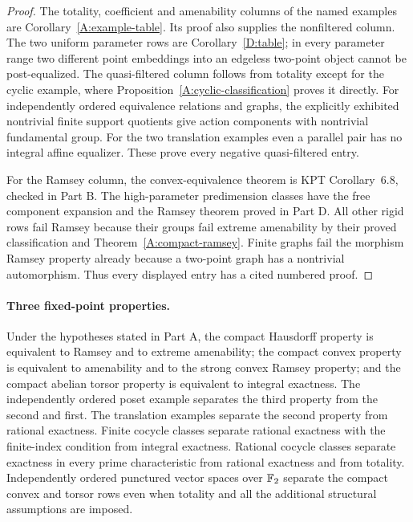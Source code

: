 \begin{proof}
The totality, coefficient and amenability columns of the named
examples are Corollary~\ref{A:example-table}. Its proof also supplies
the nonfiltered column. The two uniform parameter rows are
Corollary~\ref{D:table}; in every parameter range two different point
embeddings into an edgeless two-point object cannot be post-equalized.
The quasi-filtered column follows from totality except for the cyclic
example, where Proposition~\ref{A:cyclic-classification} proves it
directly. For independently ordered equivalence relations and graphs,
the explicitly exhibited nontrivial finite support quotients give
action components with nontrivial fundamental group. For the two
translation examples even a parallel pair has no integral affine
equalizer. These prove every negative quasi-filtered entry.

For the Ramsey column, the convex-equivalence theorem is KPT
Corollary~6.8, checked in Part B. The high-parameter predimension
classes have the free component expansion and the Ramsey theorem
proved in Part D. All other rigid rows fail Ramsey because their
groups fail extreme amenability by their proved classification and
Theorem~\ref{A:compact-ramsey}. Finite graphs fail the morphism Ramsey
property already because a two-point graph has a nontrivial
automorphism. Thus every displayed entry has a cited numbered proof.
\end{proof}

\paragraph{Three fixed-point properties.}
Under the hypotheses stated in Part A, the compact Hausdorff property
is equivalent to Ramsey and to extreme amenability; the compact convex
property is equivalent to amenability and to the strong convex Ramsey
property; and the compact abelian torsor property is equivalent to
integral exactness. The independently ordered poset example separates
the third property from the second and first. The translation examples
separate the second property from rational exactness. Finite cocycle
classes separate rational exactness with the finite-index condition
from integral exactness. Rational cocycle classes separate exactness
in every prime characteristic from rational exactness and from totality.
Independently ordered punctured vector spaces over $\mathbb F_2$ separate the
compact convex and torsor rows even when totality and all the additional
structural assumptions are imposed.

